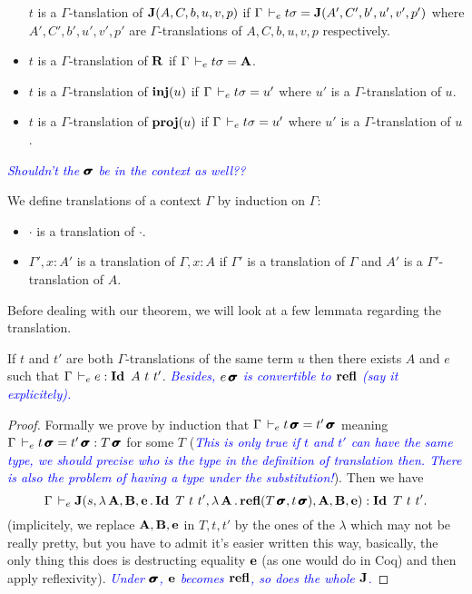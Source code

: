 \documentclass[a4paper,english]{lipics-utf8x}
\newcommand\meta[1]{\noindent\textcolor{blue}{\emph{#1}}}
\begin{document}
\begin{definition}
\begin{itemize}
            $t$ is a $\Gamma$-tanslation of $\operatorname{\mathbf{J}}(A,C,b,u,v,p)$ if
            $\Gamma \,\vdash_e t \sigma = \operatorname{\mathbf{J}}(A',C',b',u',v',p')$ where
            $A',C',b',u',v',p'$ are $\Gamma$-translations of
            $A,C,b,u,v,p$ respectively.
      \item $t$ is a $\Gamma$-translation of $\operatorname{\mathbf{R}}$ if
            $\Gamma \,\vdash_e t \sigma = \operatorname{\mathbf{A}}$.
      \item $t$ is a $\Gamma$-translation of $\operatorname{\mathbf{inj}}(u)$ if
            $\Gamma \,\vdash_e t \sigma = u'$ where $u'$ is a $\Gamma$-translation
            of $u$.
      \item $t$ is a $\Gamma$-translation of $\operatorname{\mathbf{proj}}(u)$ if
            $\Gamma \,\vdash_e t \sigma = u'$ where $u'$ is a $\Gamma$-translation
            of $u$.
    \end{itemize}
  \end{definition}

  \meta{Shouldn't the $\operatorname{\pmb{\bm{\sigma}}}$ be in the context as well??}

  \begin{definition}
    We define translations of a context $\Gamma$ by induction on $\Gamma$:
    \begin{itemize}
      \item $\cdot$ is a translation of $\cdot$.
      \item $\Gamma', x:A'$ is a translation of $\Gamma, x:A$ if $\Gamma'$ is
            a translation of $\Gamma$ and $A'$ is a $\Gamma'$-translation of
            $A$.
    \end{itemize}
  \end{definition}
  Before dealing with our theorem, we will look at a few lemmata regarding the
  translation.

  \begin{lemma}
    \label{lem:transleq}
    If $t$ and $t'$ are both $\Gamma$-translations of the same term $u$ then
    there exists $A$ and $e$ such that $\Gamma \dere e : \Id A\ t\ t'$.
    \meta{Besides, $e\operatorname{\pmb{\bm{\sigma}}}$ is convertible to $\operatorname{\mathbf{refl}}$ (say it explicitely).}
  \end{lemma}

  \begin{proof}
    Formally we prove by induction that $\Gamma \,\vdash_e t \operatorname{\pmb{\bm{\sigma}}} = t' \operatorname{\pmb{\bm{\sigma}}}$
    meaning $\Gamma \,\vdash_e t \operatorname{\pmb{\bm{\sigma}}} = t' \operatorname{\pmb{\bm{\sigma}}} : T\operatorname{\pmb{\bm{\sigma}}}$ for some $T$
    (\meta{This is only true if $t$ and $t'$ can have the same type, we should
    precise who is the type in the definition of translation then.
    There is also the problem of having a type under the substitution!}).
    Then we have
    \[\Gamma \dere \J(s,\lambda \mA, \mB, \me. \Id T\ t\ t',
    \lambda \mA. \refl(T\msigma,t\msigma),\mA,\mB,\me) : \Id T\ t\ t'.\]
    (implicitely, we replace $\operatorname{\mathbf{A}},\operatorname{\mathbf{B}},\operatorname{\mathbf{e}}$ in $T,t,t'$ by the ones of the
    $\lambda$ which may not be really pretty, but you have to admit it's easier
    written this way, basically, the only thing this does is destructing
    equality $\operatorname{\mathbf{e}}$ (as one would do in Coq) and then apply reflexivity).
    \meta{Under $\operatorname{\pmb{\bm{\sigma}}}$, $\operatorname{\mathbf{e}}$ becomes $\operatorname{\mathbf{refl}}$, so does the whole $\operatorname{\mathbf{J}}$.}
  \end{proof}
\end{document}
